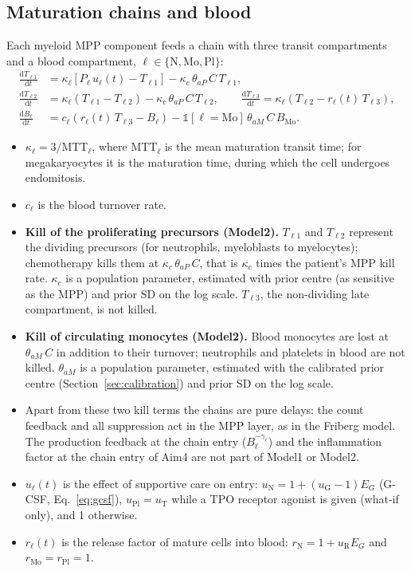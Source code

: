 \documentclass[11pt]{article}
\newcommand{\dd}{\mathrm{d}}
\newcommand{\one}{\mathbb{1}}
\begin{document}


\subsection{Maturation chains and blood}\label{sec:chains}
Each myeloid MPP component feeds a chain with three transit compartments and a blood compartment, $\ell\in\{\mathrm{N},\mathrm{Mo},\mathrm{Pl}\}$:
\begin{align}
\frac{\dd T_{\ell1}}{\dd t} &= \kappa_\ell\left[P_\ell\,u_\ell(t) - T_{\ell1}\right] - \kappa_c\,\theta_{aP}\,C\,T_{\ell1}, \label{eq:chain1}\\
\frac{\dd T_{\ell2}}{\dd t} &= \kappa_\ell\left(T_{\ell1}-T_{\ell2}\right) - \kappa_c\,\theta_{aP}\,C\,T_{\ell2}, \qquad
\frac{\dd T_{\ell3}}{\dd t} = \kappa_\ell\left(T_{\ell2}-r_\ell(t)\,T_{\ell3}\right), \label{eq:chain2}\\
\frac{\dd B_\ell}{\dd t} &= c_\ell\left(r_\ell(t)\,T_{\ell3}-B_\ell\right) - \one[\ell=\mathrm{Mo}]\,\theta_{aM}\,C\,B_{\mathrm{Mo}}. \label{eq:blood}
\end{align}
\begin{itemize}
\item $\kappa_\ell=3/\mathrm{MTT}_\ell$, where $\mathrm{MTT}_\ell$ is the mean maturation transit time; for megakaryocytes it is the maturation time, during which the cell undergoes endomitosis.
\item $c_\ell$ is the blood turnover rate.
\item \textbf{Kill of the proliferating precursors (Model2).} $T_{\ell1}$ and $T_{\ell2}$ represent the dividing precursors (for neutrophils, myeloblasts to myelocytes); chemotherapy kills them at $\kappa_c\,\theta_{aP}\,C$, that is $\kappa_c$ times the patient's MPP kill rate. $\kappa_c$ is a population parameter, estimated with prior centre \valKappaC{} (as sensitive as the MPP) and prior SD \valKappaCSd{} on the log scale. $T_{\ell3}$, the non-dividing late compartment, is not killed.
\item \textbf{Kill of circulating monocytes (Model2).} Blood monocytes are lost at $\theta_{aM}\,C$ in addition to their turnover; neutrophils and platelets in blood are not killed. $\theta_{aM}$ is a population parameter, estimated with the calibrated prior centre \valThAm{} (Section~\ref{sec:calibration}) and prior SD \valThAmSd{} on the log scale.
\item Apart from these two kill terms the chains are pure delays: the count feedback and all suppression act in the MPP layer, as in the Friberg model. The production feedback at the chain entry ($B_\ell^{-\gamma_\ell}$) and the inflammation factor at the chain entry of Aim4 are not part of Model1 or Model2.
\item $u_\ell(t)$ is the effect of supportive care on entry: $u_{\mathrm{N}}=1+(u_{\mathrm{G}}-1)E_G$ (G-CSF, Eq.~\ref{eq:gcsf}), $u_{\mathrm{Pl}}=u_{\mathrm{T}}$ while a TPO receptor agonist is given (what-if only), and 1 otherwise.
\item $r_\ell(t)$ is the release factor of mature cells into blood: $r_{\mathrm{N}}=1+u_{\mathrm{R}}E_G$ and $r_{\mathrm{Mo}}=r_{\mathrm{Pl}}=1$.
\end{itemize}
\end{document}
